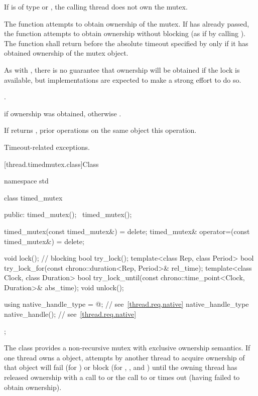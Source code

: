 \begin{itemdescr}
\pnum
\requires If  is of type  or
, the calling thread does not own the
mutex.

\pnum
\effects
The function attempts to obtain ownership of the mutex. If
 has already passed, the function attempts to obtain ownership
without blocking (as if by calling ). The function shall
return before the absolute timeout specified by
 only if it has obtained ownership of the mutex object.
\begin{note}
As with , there is no guarantee that ownership will
be obtained if the lock is available, but implementations are expected to make a
strong effort to do so.
\end{note}

\pnum
\returntype {}.

\pnum
\returns
{} if ownership was obtained, otherwise .

\pnum
\sync
If  returns , prior 
operations on the same object 
this operation.

\pnum
\throws
Timeout-related exceptions.
\end{itemdescr}

[thread.timedmutex.class]{Class }

%
\begin{codeblock}
namespace std {
  class timed_mutex {
  public:
    timed_mutex();
    ~timed_mutex();

    timed_mutex(const timed_mutex&) = delete;
    timed_mutex& operator=(const timed_mutex&) = delete;

    void lock();    // blocking
    bool try_lock();
    template<class Rep, class Period>
      bool try_lock_for(const chrono::duration<Rep, Period>& rel_time);
    template<class Clock, class Duration>
      bool try_lock_until(const chrono::time_point<Clock, Duration>& abs_time);
    void unlock();

    using native_handle_type = @\impdefnc@;          // see~\ref{thread.req.native}
    native_handle_type native_handle();                         // see~\ref{thread.req.native}
  };
}
\end{codeblock}

\pnum
The class  provides a non-recursive mutex with exclusive ownership
semantics. If one thread owns a  object, attempts by another thread
to acquire ownership of that object will fail (for ) or block
(for , , and ) until
the owning thread has released ownership with a call to  or the
call to  or  times out (having
failed to obtain ownership).

